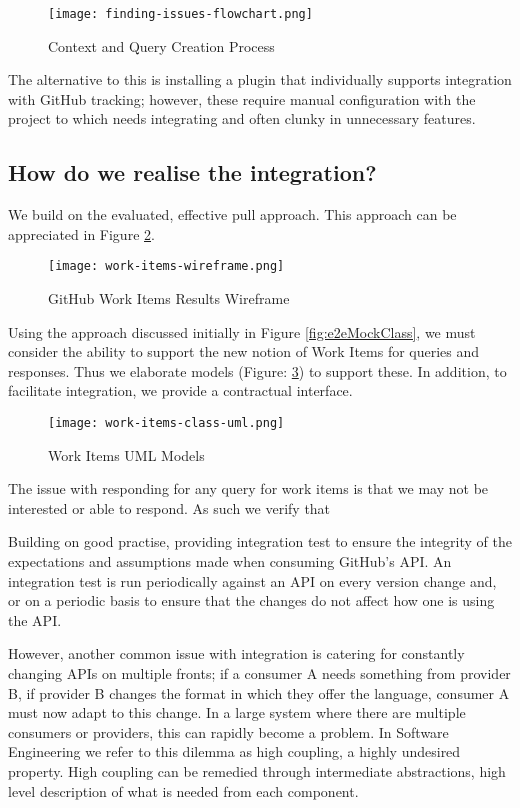 \begin{figure}[h!]
	\centering
	\texttt{[image: finding-issues-flowchart.png]}
	\caption{Context and Query Creation Process}
	\label{fig:findingInformationStandardWay}
\end{figure}

The alternative to this is installing a plugin that individually supports integration with GitHub tracking; however, these require manual configuration with the project to which needs integrating and often clunky in unnecessary features.

\subsection{How do we realise the integration?}

We build on the evaluated, effective pull approach. This approach can be appreciated in Figure \ref{fig:gitHubWorkItemsWireframe}.

\begin{figure}[h!]
	\centering
	\texttt{[image: work-items-wireframe.png]}
	\label{fig:gitHubWorkItemsWireframe}
	\caption{GitHub Work Items Results Wireframe}
\end{figure}

Using the approach discussed initially in Figure \ref{fig:e2eMockClass}, we must consider the ability to support the new notion of Work Items for queries and responses. Thus we elaborate models (Figure: \ref{fig:workItemsUMLModels}) to support these. In addition, to facilitate integration, we provide a contractual interface.

\begin{figure}[h!]
	\centering
	\texttt{[image: work-items-class-uml.png]}
	\caption{Work Items UML Models}
	\label{fig:workItemsUMLModels}
\end{figure}

The issue with responding for any query for work items is that we may not be interested or able to respond. As such we verify that 

Building on good practise, providing integration test to ensure the integrity of the expectations and assumptions made when consuming GitHub's API. An integration test is run periodically against an API on every version change and, or on a periodic basis to ensure that the changes do not affect how one is using the API.

However, another common issue with integration is catering for constantly changing APIs on multiple fronts; if a consumer A needs something from provider B, if provider B changes the format in which they offer the language, consumer A must now adapt to this change. In a large system where there are multiple consumers or providers, this can rapidly become a problem. In Software Engineering we refer to this dilemma as high coupling, a highly undesired property. High coupling can be remedied through intermediate abstractions, high level description of what is needed from each component. 

